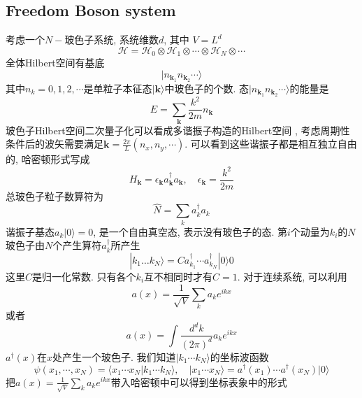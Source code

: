 \documentclass[a4paper,11pt]{article}
\begin{document}
\subsection{Freedom Boson system}
考虑一个$N-$玻色子系统, 系统维数$d$, 其中 $V=L^d$
\begin{equation*}
  \mathcal{H}=\mathcal{H}_0\otimes\mathcal{H}_1\otimes\cdots\otimes\mathcal{H}_N\otimes\cdots
\end{equation*}
全体Hilbert空间有基底
\begin{equation*}
  |n_{\mathbf{k}_1}n_{\mathbf{k}_2}\cdots\rangle
\end{equation*}
其中$n_k=0,1,2,\cdots$是单粒子本征态$|\mathbf{k}\rangle$中玻色子的个数. 态$|n_{\mathbf{k}_1}n_{\mathbf{k}_2}\cdots\rangle$的能量是
\begin{equation*}
  E=\sum_{\mathbf{k}}\frac{k^2}{2m}n_\mathbf{k}
\end{equation*}
玻色子Hilbert空间二次量子化可以看成多谐振子构造的Hilbert空间 , 考虑周期性条件后的波矢需要满足$\mathbf{k}=\frac{2\pi}{L}(n_x,n_y,\cdots)$. 可以看到这些谐振子都是相互独立自由的, 哈密顿形式写成
\begin{equation*}
  H_\mathbf{k}=\epsilon_\mathbf{k}a^\dag_\mathbf{k}a_\mathbf{k},\quad\epsilon_\mathbf{k}=\frac{k^2}{2m}
\end{equation*}
总玻色子粒子数算符为
\begin{equation*}
  \hat{N}=\sum_{k}a_k^\dag a_k
\end{equation*}
谐振子基态$a_k|0\rangle=0$, 是一个自由真空态, 表示没有玻色子的态. 第$i$个动量为$k_i$的$N$玻色子由$N$个产生算符$a_{k}^\dag$所产生
\begin{equation*}
  |k_1\dots k_N\rangle=C a_{k_1}^\dag\cdots a_{k_N}^\dag|0\rangle0
\end{equation*}
这里$C$是归一化常数. 只有各个$k_i$互不相同时才有$C=1$. 对于连续系统, 可以利用
\begin{equation*}
  a(x)=\frac{1}{\sqrt{V}}\sum_{k}a_k e^{ikx}
\end{equation*}
或者
\begin{equation*}
  a(x)=\int\frac{d^dk}{(2\pi)^d}a_k e^{ikx}
\end{equation*}
$a^\dag(x)$在$x$处产生一个玻色子. 我们知道$|k_1\cdots k_N\rangle$的坐标波函数
\begin{equation*}
  \psi(x_1,\cdots,x_N)=\langle x_1\cdots x_N|k_1\cdots k_N\rangle,\quad |x_1\cdots x_N\rangle=a^\dag(x_1)\cdots a^\dag(x_N)|0\rangle
\end{equation*}
把$a(x)=\frac{1}{\sqrt{V}}\sum_{k}a_k e^{ikx}$带入哈密顿中可以得到坐标表象中的形式
\end{document}

